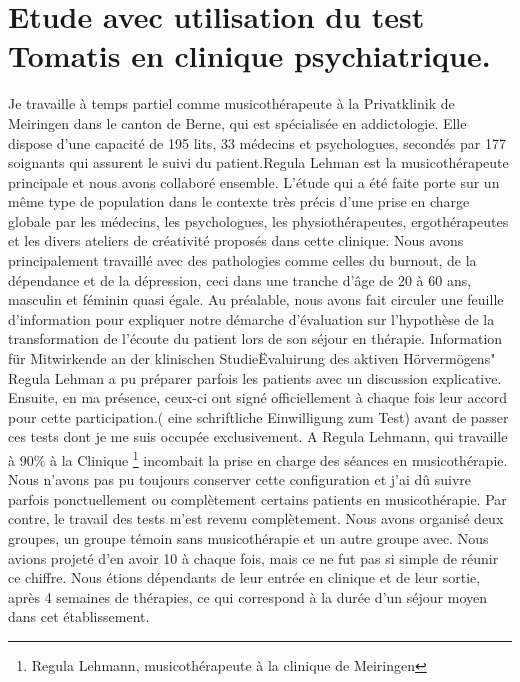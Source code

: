 \chapter{Etude avec utilisation du test Tomatis en clinique psychiatrique.}

Je travaille à temps partiel comme musicothérapeute à la Privatklinik
de Meiringen dans le canton de Berne, qui est spécialisée en
addictologie. Elle dispose d'une capacité de 195 lits, 33 médecins et
psychologues, secondés par 177 soignants qui assurent le suivi du
patient.Regula Lehman est la musicothérapeute principale et nous avons
collaboré ensemble. L'étude qui a été faite porte sur un même type de
population dans le contexte très précis d'une prise en charge globale
par les médecins, les psychologues, les physiothérapeutes,
ergothérapeutes et les divers ateliers de créativité proposés dans
cette clinique. Nous avons principalement travaillé avec des
pathologies comme celles du burnout, de la dépendance et de la
dépression, ceci dans une tranche d'âge de 20 à 60 ans, masculin et
féminin quasi égale. Au préalable, nous avons fait circuler une
feuille d'information pour expliquer notre démarche d'évaluation sur
l'hypothèse de la transformation de l'écoute du patient lors de son
séjour en thérapie. Information für Mitwirkende an der klinischen
Studie\"Evaluirung des aktiven Hörvermögens" Regula Lehman a pu
préparer parfois les patients avec un discussion explicative. Ensuite,
en ma présence, ceux-ci ont signé officiellement à chaque fois leur
accord pour cette participation.( eine schriftliche Einwilligung zum
Test) avant de passer ces tests dont je me suis occupée exclusivement.
A Regula Lehmann, qui travaille à 90\% à la Clinique \footnote{Regula
  Lehmann, musicothérapeute à la clinique de Meiringen} incombait la
prise en charge des séances en musicothérapie. Nous n'avons pas pu
toujours conserver cette configuration et j'ai dû suivre parfois
ponctuellement ou complètement certains patients en
musicothérapie. Par contre, le travail des tests m'est revenu
complètement.  Nous avons organisé deux groupes, un groupe témoin sans
musicothérapie et un autre groupe avec. Nous avions projeté d'en avoir
10 à chaque fois, mais ce ne fut pas si simple de réunir ce
chiffre. Nous étions dépendants de leur entrée en clinique et de leur
sortie, après 4 semaines de thérapies, ce qui correspond à la durée
d'un séjour moyen dans cet établissement.


